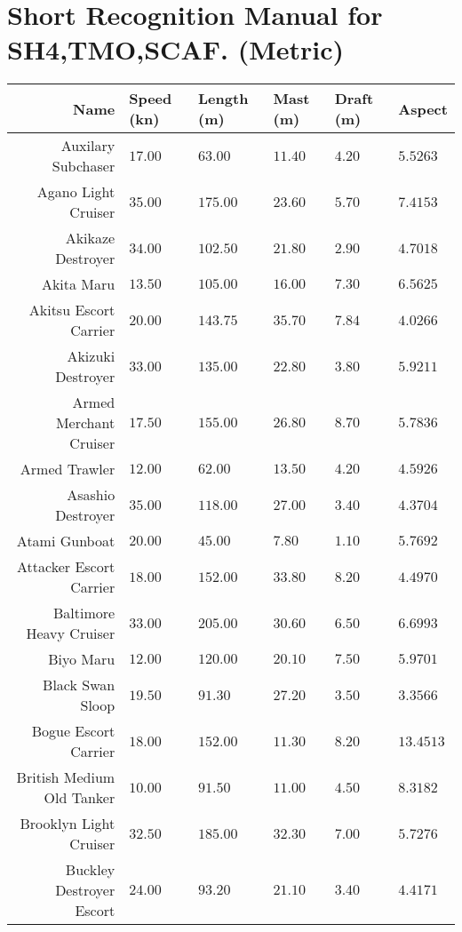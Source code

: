 \documentclass{article}
\begin{document}
\section*{Short Recognition Manual for SH4,TMO,SCAF. (Metric)}
\centering
\begin{tabularx}{\textwidth}{|r|l|l|l|l|X|}
\hline
\textbf{Name} & \textbf{Speed (kn)} & \textbf{Length (m)} & \textbf{Mast (m)} & \textbf{Draft (m)} & \textbf{Aspect}\\
\hline
 Auxilary Subchaser & $17.00$ & $63.00$ & $11.40$ & $4.20$ & $5.5263$ \\
\hline
Agano Light Cruiser & $35.00$ & $175.00$ & $23.60$ & $5.70$ & $7.4153$ \\
\hline
Akikaze Destroyer & $34.00$ & $102.50$ & $21.80$ & $2.90$ & $4.7018$ \\
\hline
Akita Maru & $13.50$ & $105.00$ & $16.00$ & $7.30$ & $6.5625$ \\
\hline
Akitsu Escort Carrier & $20.00$ & $143.75$ & $35.70$ & $7.84$ & $4.0266$ \\
\hline
Akizuki Destroyer & $33.00$ & $135.00$ & $22.80$ & $3.80$ & $5.9211$ \\
\hline
Armed Merchant Cruiser & $17.50$ & $155.00$ & $26.80$ & $8.70$ & $5.7836$ \\
\hline
Armed Trawler & $12.00$ & $62.00$ & $13.50$ & $4.20$ & $4.5926$ \\
\hline
Asashio Destroyer & $35.00$ & $118.00$ & $27.00$ & $3.40$ & $4.3704$ \\
\hline
Atami Gunboat & $20.00$ & $45.00$ & $7.80$ & $1.10$ & $5.7692$ \\
\hline
Attacker Escort Carrier & $18.00$ & $152.00$ & $33.80$ & $8.20$ & $4.4970$ \\
\hline
Baltimore Heavy Cruiser & $33.00$ & $205.00$ & $30.60$ & $6.50$ & $6.6993$ \\
\hline
Biyo Maru & $12.00$ & $120.00$ & $20.10$ & $7.50$ & $5.9701$ \\
\hline
Black Swan Sloop & $19.50$ & $91.30$ & $27.20$ & $3.50$ & $3.3566$ \\
\hline
Bogue Escort Carrier & $18.00$ & $152.00$ & $11.30$ & $8.20$ & $13.4513$ \\
\hline
British Medium Old Tanker & $10.00$ & $91.50$ & $11.00$ & $4.50$ & $8.3182$ \\
\hline
Brooklyn Light Cruiser & $32.50$ & $185.00$ & $32.30$ & $7.00$ & $5.7276$ \\
\hline
Buckley Destroyer Escort & $24.00$ & $93.20$ & $21.10$ & $3.40$ & $4.4171$ \\

\end{tabularx}
\end{document}
